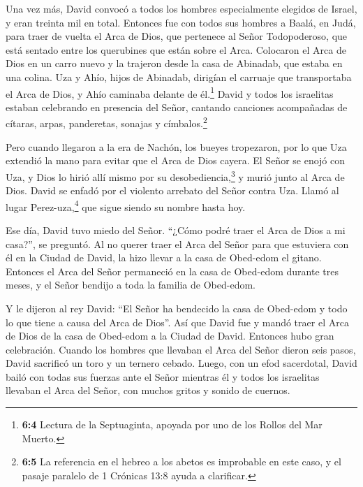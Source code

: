  Una vez más, David convocó a todos los hombres
especialmente elegidos de Israel, y eran treinta mil en total.
 Entonces fue con todos sus hombres a Baalá, en Judá, para
traer de vuelta el Arca de Dios, que pertenece al Señor Todopoderoso,
que está sentado entre los querubines que están sobre el Arca.
 Colocaron el Arca de Dios en un carro nuevo y la trajeron
desde la casa de Abinadab, que estaba en una colina. Uza y Ahío, hijos
de Abinadab, dirigían el carruaje  que transportaba el Arca
de Dios, y Ahío caminaba delante de él.\footnote{\textbf{6:4} Lectura de
  la Septuaginta, apoyada por uno de los Rollos del Mar Muerto.}
 David y todos los israelitas estaban celebrando en
presencia del Señor, cantando canciones acompañadas de cítaras, arpas,
panderetas, sonajas y címbalos.\footnote{\textbf{6:5} La referencia en
  el hebreo a los abetos es improbable en este caso, y el pasaje
  paralelo de 1 Crónicas 13:8 ayuda a clarificar.}

 Pero cuando llegaron a la era de Nachón, los bueyes
tropezaron, por lo que Uza extendió la mano para evitar que el Arca de
Dios cayera.  El Señor se enojó con Uza, y Dios lo hirió
allí mismo por su desobediencia,\footnote{\textbf{6:7} El significado de
  la palabra utilizada aquí es incierto. Puede indicar una acción
  precipitada o irreverente. Aquí parece reflejar una actitud
  presuntuosa que trataba el Arca como un simple objeto ordinario.} y
murió junto al Arca de Dios.  David se enfadó por el
violento arrebato del Señor contra Uza. Llamó al lugar
Perez-uza,\footnote{\textbf{6:8} Significa ``arrebato contra Uza.''} que
sigue siendo su nombre hasta hoy.

 Ese día, David tuvo miedo del Señor. ``¿Cómo podré traer el
Arca de Dios a mi casa?'', se preguntó.  Al no querer traer
el Arca del Señor para que estuviera con él en la Ciudad de David, la
hizo llevar a la casa de Obed-edom el gitano.  Entonces el
Arca del Señor permaneció en la casa de Obed-edom durante tres meses, y
el Señor bendijo a toda la familia de Obed-edom.

 Y le dijeron al rey David: ``El Señor ha bendecido la casa
de Obed-edom y todo lo que tiene a causa del Arca de Dios''. Así que
David fue y mandó traer el Arca de Dios de la casa de Obed-edom a la
Ciudad de David. Entonces hubo gran celebración.  Cuando
los hombres que llevaban el Arca del Señor dieron seis pasos, David
sacrificó un toro y un ternero cebado.  Luego, con un efod
sacerdotal, David bailó con todas sus fuerzas ante el Señor
 mientras él y todos los israelitas llevaban el Arca del
Señor, con muchos gritos y sonido de cuernos.

